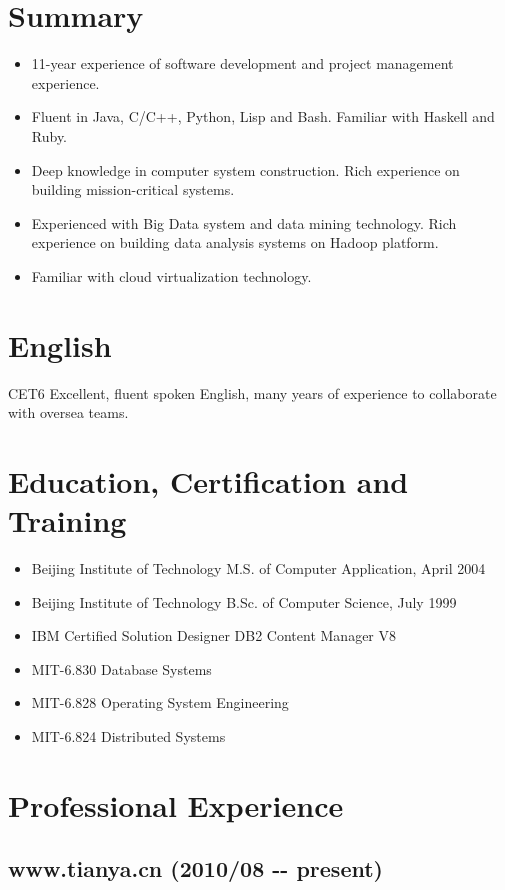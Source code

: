 \documentclass[a4paper]{article}
\begin{document}
\begin{CJK}{UTF8}{gkai}
\section*{Summary}
\begin{itemize}
\item 11-year experience of software development and project management
experience.
\item Fluent in Java, C/C++, Python, Lisp and Bash. Familiar with Haskell and Ruby.
\item Deep knowledge in computer system construction. Rich experience on building
mission-critical systems.
\item Experienced with Big Data system and data mining technology. Rich experience
on building data analysis systems on Hadoop platform.
\item Familiar with cloud virtualization technology.
\end{itemize}

\section*{English}
CET6 Excellent, fluent spoken English, many years of experience to collaborate
with oversea teams.

\section*{Education, Certification and Training}
\begin{itemize}
\item Beijing Institute of Technology M.S. of Computer Application, April 2004
\item Beijing Institute of Technology B.Sc. of Computer Science, July 1999
\item IBM Certified Solution Designer DB2 Content Manager V8
\item MIT-6.830 Database Systems
\item MIT-6.828 Operating System Engineering
\item MIT-6.824 Distributed Systems
\end{itemize}

\section*{Professional Experience}

\subsection*{www.tianya.cn (2010/08 -{}- present)}


\end{CJK}
\end{document}
